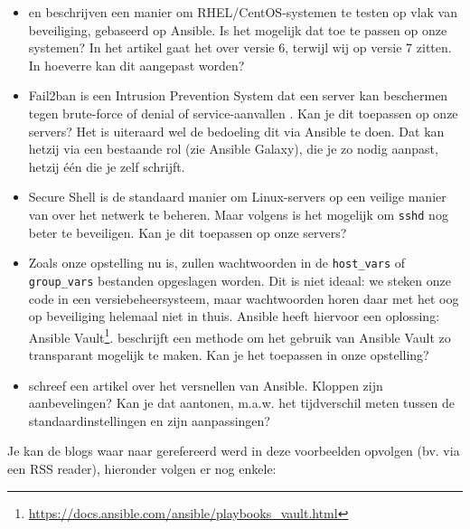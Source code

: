 \begin{itemize}
  \item \textcite{Hayden2015} en \textcite{Davila2015} beschrijven een manier om RHEL/CentOS-systemen te testen op vlak van beveiliging, gebaseerd op Ansible. Is het mogelijk dat toe te passen op onze systemen? In het artikel gaat het over versie 6, terwijl wij op versie 7 zitten. In hoeverre kan dit aangepast worden?
  \item Fail2ban is een Intrusion Prevention System dat een server kan beschermen tegen brute-force of denial of service-aanvallen \autocite{Sawiyati2014}. Kan je dit toepassen op onze servers? Het is uiteraard wel de bedoeling dit via Ansible te doen. Dat kan hetzij via een bestaande rol (zie Ansible Galaxy), die je zo nodig aanpast, hetzij één die je zelf schrijft.
  \item Secure Shell is de standaard manier om Linux-servers op een veilige manier van over het netwerk te beheren. Maar volgens \textcite{stribika2015} is het mogelijk om \texttt{sshd} nog beter te beveiligen. Kan je dit toepassen op onze servers?
  \item Zoals onze opstelling nu is, zullen wachtwoorden in de \texttt{host\_vars} of \texttt{group\_vars} bestanden opgeslagen worden. Dit is niet ideaal: we steken onze code in een versiebeheersysteem, maar wachtwoorden horen daar met het oog op beveiliging helemaal niet in thuis. Ansible heeft hiervoor een oplossing: Ansible Vault\footnote{\url{https://docs.ansible.com/ansible/playbooks_vault.html}}. \textcite{Blanc2015} beschrijft een methode om het gebruik van Ansible Vault zo transparant mogelijk te maken. Kan je het toepassen in onze opstelling?
  \item \textcite{Johnson2015} schreef een artikel over het versnellen van Ansible. Kloppen zijn aanbevelingen? Kan je dat aantonen, m.a.w. het tijdverschil meten tussen de standaardinstellingen en zijn aanpassingen?
\end{itemize}

Je kan de blogs waar naar gerefereerd werd in deze voorbeelden opvolgen (bv. via een RSS reader), hieronder volgen er nog enkele:

